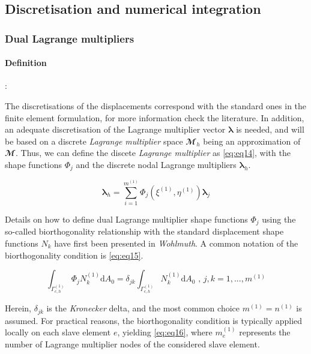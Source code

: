 \documentclass[a4paper,10pt]{article} %
\begin{document}
\subsection{Discretisation and numerical integration}

\subsubsection{Dual Lagrange multipliers}

\paragraph{Definition}:

The discretisations of the displacements correspond with the standard ones in the finite element formulation, for more information check the literature\cite{Zienkiewicz1}. In addition, an adequate discretisation of the Lagrange multiplier vector $\boldsymbol{\lambda}$ is needed, and will be based on a discrete \textit{Lagrange multiplier} space $\mathbfcal{M}_h$ being an approximation of $\mathbfcal{M}$. Thus, we can define the discete \textit{Lagrange multiplier} as \eqref{eq:eq14}, with the shape functions $\Phi_j$ and the discrete nodal Lagrange multipliers $\boldsymbol{\lambda}_h$.

\begin{equation}\label{eq:eq14}
 \boldsymbol{\lambda}_h = \sum_{i=1}^{m^{(1)}} \Phi_j\left(\xi^{(1)},\eta^{(1)} \right) \boldsymbol{\lambda}_j
\end{equation}

Details on how to define dual Lagrange multiplier shape functions $\Phi_j$ using the so-called biorthogonality relationship with the standard displacement shape functions $N_k$ have first been presented in \textit{Wohlmuth}\cite{wohlmuth}. A common notation of the biorthogonality condition is \eqref{eq:eq15}.

\begin{equation}\label{eq:eq15}
 \int_{\Gamma_{c,h}^{(1)}}\Phi_j N_k^{(1)} \text{d}A_0 = \delta_{jk} \int_{\Gamma_{c,h}^{(1)}} N_k^{(1)} \text{d}A_0 \text{ , } j,k=1,...,m^{(1)}
\end{equation}

Herein, $\delta_{jk}$ is the \textit{Kronecker} delta, and the most common choice $m^{(1)} = n^{(1)}$ is assumed. For
practical reasons, the biorthogonality condition is typically applied locally on each slave element $e$, yielding \eqref{eq:eq16}, where $m_e^{(1)}$ represents the number of Lagrange multiplier nodes of the considered slave element.
\end{document}
